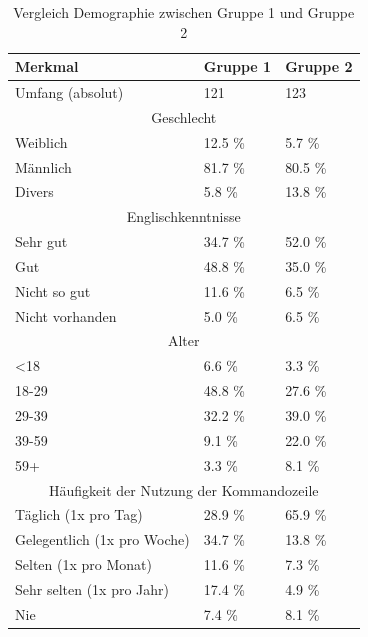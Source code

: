 \begin{table}[htbp]
\centering
\caption{Vergleich Demographie zwischen Gruppe 1 und Gruppe 2}
\begin{tabular}{ |p{6cm}||p{3cm}|p{3cm}| }
  \hline
  Merkmal & Gruppe 1 & Gruppe 2 \\
  \hline
  Umfang (absolut) & 121  & 123 \\
  \hline
  \multicolumn{3}{|c|}{Geschlecht} \\
  \hline
  Weiblich                      & 12.5 \%       & 5.7  \%       \\
  Männlich                      & 81.7 \%       & 80.5 \%       \\
  Divers                        & 5.8  \%       & 13.8 \%       \\
  \hline
  \multicolumn{3}{|c|}{Englischkenntnisse} \\
  \hline
  Sehr gut                      & 34.7 \%       & 52.0 \%      \\
  Gut                           & 48.8 \%       & 35.0 \%       \\
  Nicht so gut                  & 11.6 \%       & 6.5 \%        \\
  Nicht vorhanden               & 5.0  \%       & 6.5 \%        \\
  \hline
  \multicolumn{3}{|c|}{Alter} \\
  \hline
  <18                           & 6.6  \%       & 3.3  \%       \\
  18-29                         & 48.8 \%       & 27.6 \%       \\
  29-39                         & 32.2 \%       & 39.0 \%       \\
  39-59                         & 9.1  \%       & 22.0 \%       \\
  59+                           & 3.3  \%       & 8.1 \%        \\
  \hline
  \multicolumn{3}{|c|}{Häufigkeit der Nutzung der Kommandozeile} \\
  \hline
  Täglich (1x pro Tag)          & 28.9 \%       & 65.9  \%      \\
  Gelegentlich (1x pro Woche)   & 34.7 \%       & 13.8  \%      \\
  Selten (1x pro Monat)         & 11.6 \%       & 7.3  \%       \\
  Sehr selten (1x pro Jahr)     & 17.4 \%       & 4.9  \%       \\
  Nie                           & 7.4  \%       & 8.1  \%       \\
  \hline
\end{tabular}
\label{demo_g12}
\end{table}

